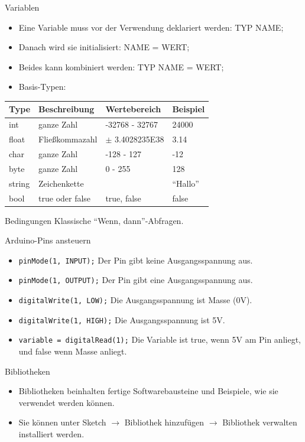 \documentclass[12pt]{beamer}
\begin{document}
\begin{frame}{Variablen}
\begin{itemize}
\item Eine Variable muss vor der Verwendung deklariert werden:
TYP NAME;
\item Danach wird sie initialisiert: NAME = WERT;
\item Beides kann kombiniert werden: TYP NAME = WERT;
\item Basis-Typen:
\end{itemize}
\begin{tabular}{|l|l|l|l|}
Type   & Beschreibung    & Wertebereich   & Beispiel \\
\hline
int    & ganze Zahl      & -32768 - 32767 & 24000    \\
float  & Fließkommazahl  & $\pm$ 3.4028235E38  & 3.14     \\
char   & ganze Zahl      & -128 - 127     & -12      \\
byte   & ganze Zahl      & 0 - 255        & 128      \\
string & Zeichenkette    &                & “Hallo”  \\
bool   & true oder false & true, false    & false    \\
\end{tabular}
\end{frame}

\begin{frame}{Bedingungen}
Klassische “Wenn, dann”-Abfragen.

\end{frame}

\begin{frame}{Arduino-Pins ansteuern}
\begin{itemize}
\item \texttt{pinMode(1, INPUT);} Der Pin gibt keine Ausgangsspannung aus.
\item \texttt{pinMode(1, OUTPUT);} Der Pin gibt eine Ausgangsspannung aus.
\item \texttt{digitalWrite(1, LOW);} Die Ausgangsspannung ist Masse (0V).
\item \texttt{digitalWrite(1, HIGH);} Die Ausgangsspannung ist 5V.
\item \texttt{variable = digitalRead(1);} Die Variable ist true, wenn 5V am
Pin anliegt, und false wenn Masse anliegt.
\end{itemize}
\end{frame}

\begin{frame}{Bibliotheken}
\begin{itemize}
\item Bibliotheken beinhalten fertige Softwarebausteine und Beispiele, wie sie verwendet werden können.
\item Sie können unter Sketch $\rightarrow$ Bibliothek hinzufügen $\rightarrow$ Bibliothek verwalten installiert werden.
\end{itemize}
\end{frame}
\end{document}
